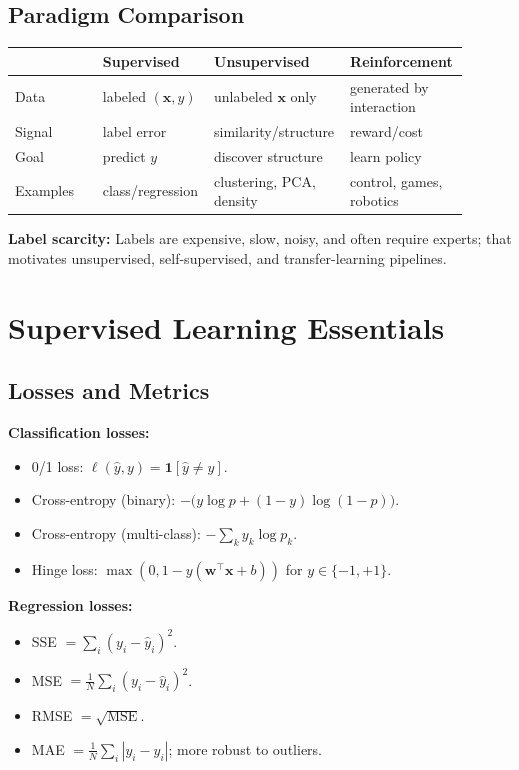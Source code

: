 \documentclass[10pt,twocolumn]{article}
\newcommand{\x}{\mathbf{x}}
\newcommand{\w}{\mathbf{w}}
\newcommand{\chead}[1]{\vspace{0.15em}\textbf{#1:} }
\begin{document}
\subsection{Paradigm Comparison}
\begin{center}
\renewcommand{\arraystretch}{1.12}
\begin{tabular}{>{\raggedright\arraybackslash}p{0.19\linewidth} >{\raggedright\arraybackslash}p{0.24\linewidth} >{\raggedright\arraybackslash}p{0.24\linewidth} >{\raggedright\arraybackslash}p{0.23\linewidth}}
\toprule
 & Supervised & Unsupervised & Reinforcement \\
\midrule
Data & labeled $(\x,y)$ & unlabeled $\x$ only & generated by interaction \\
Signal & label error & similarity/structure & reward/cost \\
Goal & predict $y$ & discover structure & learn policy \\
Examples & class/regression & clustering, PCA, density & control, games, robotics \\
\bottomrule
\end{tabular}
\end{center}
\chead{Label scarcity} Labels are expensive, slow, noisy, and often require experts; that motivates unsupervised, self-supervised, and transfer-learning pipelines.

\section{Supervised Learning Essentials}
\subsection{Losses and Metrics}
\chead{Classification losses}
\begin{itemize}
  \item 0/1 loss: $\ell(\hat y,y)=\mathbf{1}[\hat y\neq y]$.
  \item Cross-entropy (binary): $-\big(y\log p + (1-y)\log(1-p)\big)$.
  \item Cross-entropy (multi-class): $-\sum_k y_k \log p_k$.
  \item Hinge loss: $\max(0,1-y(\w^\top\x+b))$ for $y\in\{-1,+1\}$.
\end{itemize}

\newpage

\chead{Regression losses}
\begin{itemize}
  \item SSE $=\sum_i (y_i-\hat y_i)^2$.
  \item MSE $=\frac{1}{N}\sum_i (y_i-\hat y_i)^2$.
  \item RMSE $=\sqrt{\text{MSE}}$.
  \item MAE $=\frac{1}{N}\sum_i |y_i-\hat y_i|$; more robust to outliers.
\end{itemize}
\end{document}
